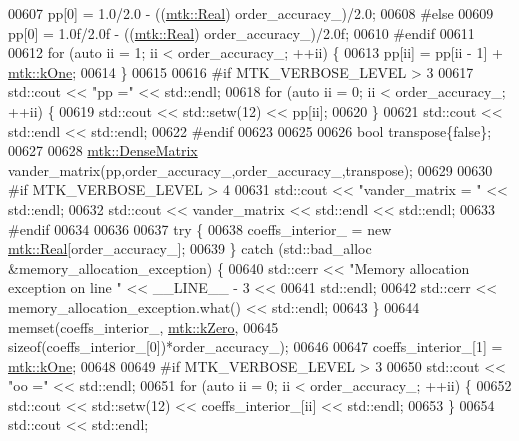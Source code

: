 \begin{DoxyCode}
{{00607   pp[0] = 1.0/2.0 - ((\hyperlink{group__c01-roots_gac080bbbf5cbb5502c9f00405f894857d}{mtk::Real}) order\_accuracy\_)/2.0;
00608 \textcolor{preprocessor}{  #else}
00609   pp[0] = 1.0f/2.0f - ((\hyperlink{group__c01-roots_gac080bbbf5cbb5502c9f00405f894857d}{mtk::Real}) order\_accuracy\_)/2.0f;
00610 \textcolor{preprocessor}{  #endif}
00611 
00612   \textcolor{keywordflow}{for} (\textcolor{keyword}{auto} ii = 1; ii < order\_accuracy\_; ++ii) \{
00613     pp[ii] = pp[ii - 1] + \hyperlink{group__c01-roots_ga26407c24d43b6b95480943340d285c71}{mtk::kOne};
00614   \}
00615 
00616 \textcolor{preprocessor}{  #if MTK\_VERBOSE\_LEVEL > 3}
00617   std::cout << \textcolor{stringliteral}{"pp ="} << std::endl;
00618   \textcolor{keywordflow}{for} (\textcolor{keyword}{auto} ii = 0; ii < order\_accuracy\_; ++ii) \{
00619     std::cout << std::setw(12) << pp[ii];
00620   \}
00621   std::cout << std::endl << std::endl;
00622 \textcolor{preprocessor}{  #endif}
00623 
00625 
00626   \textcolor{keywordtype}{bool} transpose\{\textcolor{keyword}{false}\};
00627 
00628   \hyperlink{classmtk_1_1DenseMatrix}{mtk::DenseMatrix} vander\_matrix(pp,order\_accuracy\_,order\_accuracy\_,transpose);
00629 
00630 \textcolor{preprocessor}{  #if MTK\_VERBOSE\_LEVEL > 4}
00631   std::cout << \textcolor{stringliteral}{"vander\_matrix = "} << std::endl;
00632   std::cout << vander\_matrix << std::endl << std::endl;
00633 \textcolor{preprocessor}{  #endif}
00634 
00636 
00637   \textcolor{keywordflow}{try} \{
00638     coeffs\_interior\_ = \textcolor{keyword}{new} \hyperlink{group__c01-roots_gac080bbbf5cbb5502c9f00405f894857d}{mtk::Real}[order\_accuracy\_];
00639   \} \textcolor{keywordflow}{catch} (std::bad\_alloc &memory\_allocation\_exception) \{
00640     std::cerr << \textcolor{stringliteral}{"Memory allocation exception on line "} << \_\_LINE\_\_ - 3 <<
00641       std::endl;
00642     std::cerr << memory\_allocation\_exception.what() << std::endl;
00643   \}
00644   memset(coeffs\_interior\_, \hyperlink{group__c01-roots_ga59a451a5fae30d59649bcda274fea271}{mtk::kZero},
00645 \textcolor{keyword}{sizeof}(coeffs\_interior\_[0])*order\_accuracy\_);
00646 
00647   coeffs\_interior\_[1] = \hyperlink{group__c01-roots_ga26407c24d43b6b95480943340d285c71}{mtk::kOne};
00648 
00649 \textcolor{preprocessor}{  #if MTK\_VERBOSE\_LEVEL > 3}
00650   std::cout << \textcolor{stringliteral}{"oo ="} << std::endl;
00651   \textcolor{keywordflow}{for} (\textcolor{keyword}{auto} ii = 0; ii < order\_accuracy\_; ++ii) \{
00652     std::cout << std::setw(12) << coeffs\_interior\_[ii] << std::endl;
00653   \}
00654   std::cout << std::endl;
}}
\end{DoxyCode}
